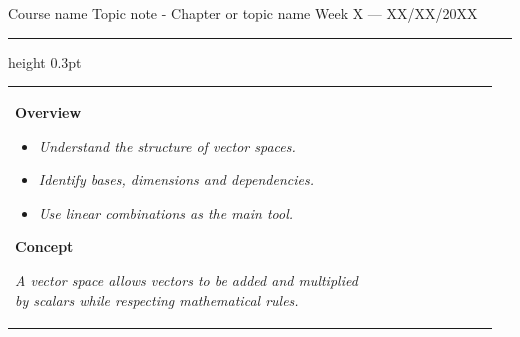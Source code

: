 \documentclass[10pt,a4paper]{article}
\begin{document}

{\scriptsize
Course name
\hfill
Topic note - Chapter or topic name
\hfill
Week X --- XX/XX/20XX
}

\vspace{1mm}

\hrule height 0.3pt

\vspace{3mm}





\begin{tabular}{p{0.72\linewidth}|p{0.24\linewidth}}




\begin{minipage}[t]{\linewidth}



\textbf{Overview}


\begin{itemize}

\item \textit{Understand the structure of vector spaces.}

\item \textit{Identify bases, dimensions and dependencies.}

\item \textit{Use linear combinations as the main tool.}

\end{itemize}



\vspace{3mm}





\begin{tcolorbox}[
colback=blue!5,
colframe=blue!40,
boxrule=0.5pt,
arc=1mm
]

\textbf{Concept}

\textit{
A vector space allows vectors to be added and multiplied
by scalars while respecting mathematical rules.
}

\end{tcolorbox}




\end{minipage}
\end{tabular}
\end{document}
